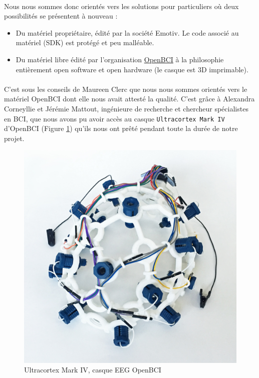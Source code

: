 \documentclass[11pt,a4paper]{article}
\theoremstyle{plain}
\theoremstyle{definition}
\begin{document}
\paragraph{} Nous nous sommes donc orientés vers les solutions pour particuliers où deux possibilités se présentent à nouveau :
\begin{itemize}
    \item Du matériel propriétaire, édité par la société Emotiv. Le code associé au matériel (SDK) est protégé et peu malléable.
    \item Du matériel libre édité par l'organisation \href{http://openbci.com/}{OpenBCI} à la philosophie entièrement open software et open hardware (le casque est 3D imprimable).
\end{itemize}
\paragraph{} C'est sous les conseils de Maureen Clerc que nous nous sommes orientés vers le matériel OpenBCI dont elle nous avait attesté la qualité. C'est grâce à Alexandra Corneyllie et Jérémie Mattout, ingénieure de recherche et chercheur spécialistes en BCI, que nous avons pu avoir accès au casque \texttt{Ultracortex Mark IV} d'OpenBCI (Figure \ref{openbci}) qu'ils nous ont prêté pendant toute la durée de notre projet.

\begin{figure}[h!]
\centering
\includegraphics[scale=0.05]{images/OpenBCI.jpg}
\caption{Ultracortex Mark IV, casque EEG OpenBCI}
\label{openbci}
\end{figure}
\end{document}
